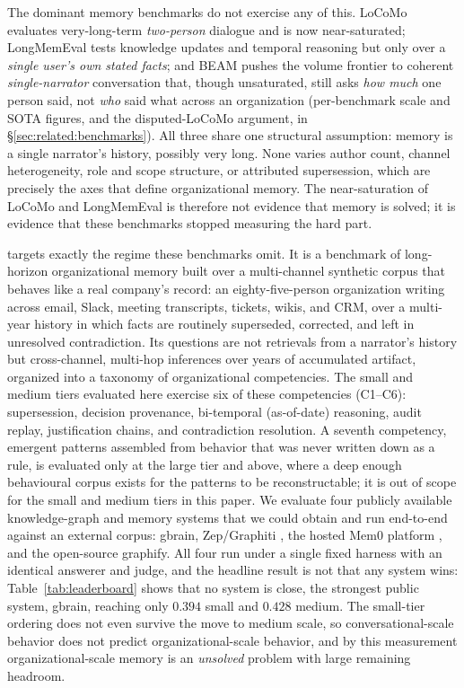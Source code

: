 The dominant memory benchmarks do not exercise any of this. LoCoMo
\citep{maharana2024locomo} evaluates very-long-term \emph{two-person} dialogue and is
now near-saturated; LongMemEval \citep{wu2024longmemeval} tests knowledge updates and
temporal reasoning but only over a \emph{single user's own stated facts}; and BEAM
\citep{beam2025} pushes the volume frontier to coherent \emph{single-narrator}
conversation that, though unsaturated, still asks \emph{how much} one person said, not
\emph{who} said what across an organization (per-benchmark scale and SOTA figures, and
the disputed-LoCoMo argument, in \S\ref{sec:related:benchmarks}). All three share one
structural assumption: memory is a single narrator's history, possibly very long. None
varies author count, channel heterogeneity, role and scope structure, or attributed
supersession, which are precisely the axes that define organizational memory. The
near-saturation of LoCoMo and LongMemEval is therefore not evidence that memory is
solved; it is evidence that these benchmarks stopped measuring the hard part.

\bench{} targets exactly the regime these benchmarks omit. It is a benchmark of
long-horizon organizational memory built over a multi-channel synthetic corpus that
behaves like a real company's record: an eighty-five-person organization writing
across email, Slack, meeting transcripts, tickets, wikis, and CRM, over a multi-year
history in which facts are routinely superseded, corrected, and left in unresolved
contradiction. Its questions are not retrievals from a narrator's history but
cross-channel, multi-hop inferences over years of accumulated artifact, organized
into a taxonomy of organizational competencies. The small and medium tiers evaluated
here exercise six of these competencies (C1--C6): supersession, decision provenance,
bi-temporal (as-of-date) reasoning, audit replay, justification chains, and
contradiction resolution. A seventh competency, emergent patterns assembled from
behavior that was never written down as a rule, is evaluated only at the large tier
and above, where a deep enough behavioural corpus exists for the patterns to be
reconstructable; it is out of scope for the small and medium tiers in this paper.
We evaluate four publicly available knowledge-graph and memory systems that we
could obtain and run end-to-end against an external corpus: gbrain, Zep/Graphiti
\citep{zep_graphiti_2025}, the hosted Mem0 platform \citep{mem0_2024}, and the
open-source graphify. All four run under a single fixed harness with an identical
answerer and judge, and the headline result is not that any system wins:
Table~\ref{tab:leaderboard} shows that no system is close, the strongest public
system, gbrain, reaching only $0.394$ small and $0.428$ medium. The small-tier
ordering does not even survive the move to medium scale, so conversational-scale
behavior does not predict organizational-scale behavior, and by this measurement
organizational-scale memory is an \emph{unsolved} problem with large remaining
headroom.

